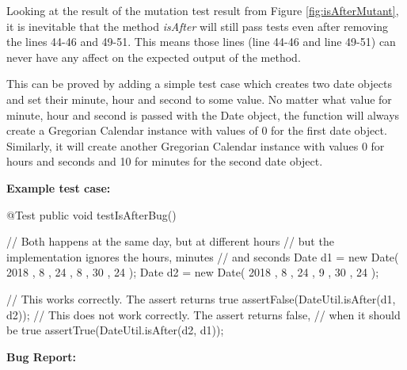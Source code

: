 \documentclass[fontsize=12pt,paper=letter,twoside]{scrartcl}
\begin{document}
\clearpage
\noindent Looking at the result of the mutation test result from Figure \ref{fig:isAfterMutant}, it is inevitable that the method \emph{isAfter} will still pass tests even after removing the lines 44-46 and 49-51. This means those lines (line 44-46 and line 49-51) can never have any affect on the expected output of the method.

\bigskip

\noindent This can be proved by adding a simple test case which creates two date objects and set their minute, hour and second to some value. No matter what value for minute, hour and second is passed with the Date object, the function will always create a Gregorian Calendar instance with values of 0 for the first date object. Similarly, it will create another Gregorian Calendar instance with values 0 for hours and seconds and 10 for minutes for the second date object.

\bigskip

\noindent \textbf{Example test case:} \label{isAfter:example_test_case}

\begin{code}
    @Test
    public void testIsAfterBug() {
    	// Both happens at the same day, but at different hours
    	// but the implementation ignores the hours, minutes
    	// and seconds
    	Date d1 = new Date( 2018 , 8 , 24 , 8 , 30 , 24 );
    	Date d2 = new Date( 2018 , 8 , 24 , 9 , 30 , 24 );
    	
    	// This works correctly. The assert returns true
    	assertFalse(DateUtil.isAfter(d1, d2));
    	// This does not work correctly. The assert returns false,
    	// when it should be true
    	assertTrue(DateUtil.isAfter(d2, d1));
    }
\end{code}

\bigskip

\noindent \textbf{Bug Report:}
\end{document}
